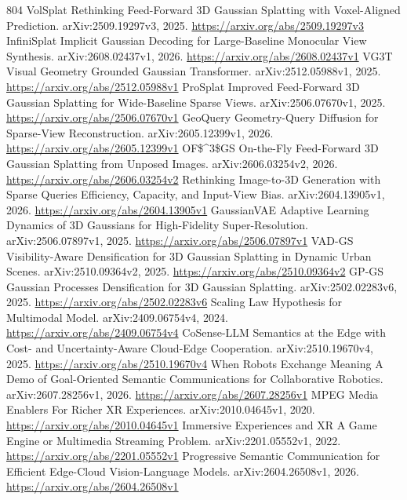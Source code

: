 \documentclass[11pt]{article}
\begin{document}
\begin{thebibliography}{804}
 VolSplat Rethinking Feed-Forward 3D Gaussian Splatting with Voxel-Aligned Prediction. arXiv:2509.19297v3, 2025. \url{https://arxiv.org/abs/2509.19297v3}
 InfiniSplat Implicit Gaussian Decoding for Large-Baseline Monocular View Synthesis. arXiv:2608.02437v1, 2026. \url{https://arxiv.org/abs/2608.02437v1}
 VG3T Visual Geometry Grounded Gaussian Transformer. arXiv:2512.05988v1, 2025. \url{https://arxiv.org/abs/2512.05988v1}
 ProSplat Improved Feed-Forward 3D Gaussian Splatting for Wide-Baseline Sparse Views. arXiv:2506.07670v1, 2025. \url{https://arxiv.org/abs/2506.07670v1}
 GeoQuery Geometry-Query Diffusion for Sparse-View Reconstruction. arXiv:2605.12399v1, 2026. \url{https://arxiv.org/abs/2605.12399v1}
 OF\$\textasciicircum{}3\$GS On-the-Fly Feed-Forward 3D Gaussian Splatting from Unposed Images. arXiv:2606.03254v2, 2026. \url{https://arxiv.org/abs/2606.03254v2}
 Rethinking Image-to-3D Generation with Sparse Queries Efficiency, Capacity, and Input-View Bias. arXiv:2604.13905v1, 2026. \url{https://arxiv.org/abs/2604.13905v1}
 GaussianVAE Adaptive Learning Dynamics of 3D Gaussians for High-Fidelity Super-Resolution. arXiv:2506.07897v1, 2025. \url{https://arxiv.org/abs/2506.07897v1}
 VAD-GS Visibility-Aware Densification for 3D Gaussian Splatting in Dynamic Urban Scenes. arXiv:2510.09364v2, 2025. \url{https://arxiv.org/abs/2510.09364v2}
 GP-GS Gaussian Processes Densification for 3D Gaussian Splatting. arXiv:2502.02283v6, 2025. \url{https://arxiv.org/abs/2502.02283v6}
 Scaling Law Hypothesis for Multimodal Model. arXiv:2409.06754v4, 2024. \url{https://arxiv.org/abs/2409.06754v4}
 CoSense-LLM Semantics at the Edge with Cost- and Uncertainty-Aware Cloud-Edge Cooperation. arXiv:2510.19670v4, 2025. \url{https://arxiv.org/abs/2510.19670v4}
 When Robots Exchange Meaning A Demo of Goal-Oriented Semantic Communications for Collaborative Robotics. arXiv:2607.28256v1, 2026. \url{https://arxiv.org/abs/2607.28256v1}
 MPEG Media Enablers For Richer XR Experiences. arXiv:2010.04645v1, 2020. \url{https://arxiv.org/abs/2010.04645v1}
 Immersive Experiences and XR A Game Engine or Multimedia Streaming Problem. arXiv:2201.05552v1, 2022. \url{https://arxiv.org/abs/2201.05552v1}
 Progressive Semantic Communication for Efficient Edge-Cloud Vision-Language Models. arXiv:2604.26508v1, 2026. \url{https://arxiv.org/abs/2604.26508v1}

\end{thebibliography}
\end{document}
